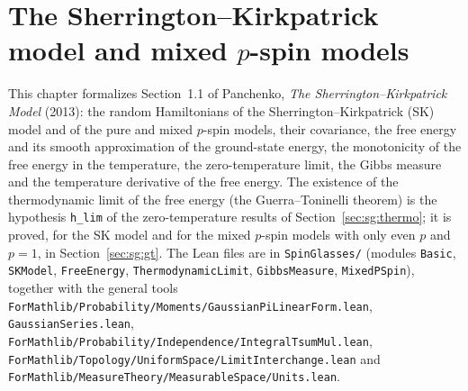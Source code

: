 \chapter{The Sherrington--Kirkpatrick model and mixed $p$-spin models}\label{chap:sg}

This chapter formalizes Section~1.1 of Panchenko, \emph{The Sherrington--Kirkpatrick Model} (2013): the random
Hamiltonians of the Sherrington--Kirkpatrick (SK) model and of the pure and mixed $p$-spin models, their
covariance, the free energy and its smooth approximation of the ground-state energy, the monotonicity of the
free energy in the temperature, the zero-temperature limit, the Gibbs measure and the temperature derivative of
the free energy. The existence of the thermodynamic limit of the free energy (the Guerra--Toninelli theorem) is
the hypothesis \texttt{h\_lim} of the zero-temperature results of Section~\ref{sec:sg:thermo}; it is proved, for the
SK model and for the mixed $p$-spin models with only even $p$ and $p=1$, in Section~\ref{sec:sg:gt}. The Lean files are in
\texttt{SpinGlasses/} (modules \texttt{Basic}, \texttt{SKModel}, \texttt{FreeEnergy}, \texttt{ThermodynamicLimit},
\texttt{GibbsMeasure}, \texttt{MixedPSpin}), together with the general tools
\texttt{ForMathlib/Probability/Moments/GaussianPiLinearForm.lean}, \texttt{GaussianSeries.lean},
\texttt{ForMathlib/Probability/Independence/IntegralTsumMul.lean},
\texttt{ForMathlib/Topology/UniformSpace/LimitInterchange.lean} and
\texttt{ForMathlib/MeasureTheory/MeasurableSpace/Units.lean}.

